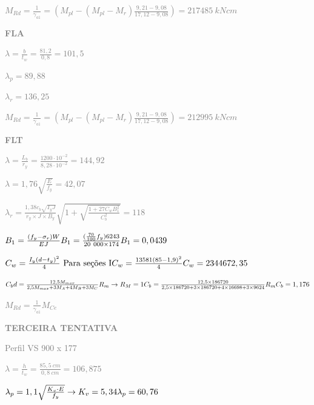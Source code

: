 \begin{enumerate}
    \textcolor{gray}{$M_{Rd} = \frac{1}{\gamma_{a1}} = (M_{pl}-(M_{pl}-M_r)\frac{9,21-9,08}{17,12-9,08})= 217485 \ kNcm$}

    \textcolor{gray}{\textbf{FLA}}

    \textcolor{gray}{$\lambda = \frac{b}{t_w} = \frac{81,2}{0,8} = 101,5$}

    \textcolor{gray}{$\lambda_p = 89,88$}

    \textcolor{gray}{$\lambda_r = 136,25$}

    \textcolor{gray}{$M_{Rd} = \frac{1}{\gamma_{a1}} = (M_{pl}-(M_{pl}-M_r)\frac{9,21-9,08}{17,12-9,08}) = 212995 \ kNcm$}

    \textcolor{gray}{\textbf{FLT}}

    \textcolor{gray}{$\lambda = \frac{L_b}{r_y} = \frac{1200 \cdot 10^{-2}}{8,28 \cdot 10^{-2}} = 144,92$}

    \textcolor{gray}{$\lambda = 1,76 \sqrt{\frac{E}{f_y}} = 42,07$}

    \textcolor{gray}{$\lambda_r = \frac{1,38 c_b \sqrt{I_yJ}}{r_y \times J \times B_y} \sqrt{1+ \sqrt{\frac{1+27C_w B_1^2}{C_b^2}}}= 118$}

    \textcolor{gray}{$B_1 = \frac{(f_y - \sigma_r)W}{EJ} \newline B_1 = \frac{(\frac{70}{100}f_y) 6243}{20 \ 000 \times 174} \newline B_1 = 0,0439$}

    \textcolor{gray}{$C_w = \frac{I_y(d-t_y)^2}{4} \ \text{Para seções I} \newline C_w = \frac{13581(85-1,9)^2}{4} \newline C_w = 2344672,35$}

    \textcolor{gray}{$C_b d = \frac{12,5 M_{max}}{2,5M_{max}+3M_A+4M_B+3M_C}R_m  \to R_M =1 \newline C_b = \frac{12,5 \times 186720}{2,5 \times 186720+3 \times 186720 +4 \times 16698 +3 \times 9624}R_m \newline C_b = 1,176$}

    \textcolor{gray}{$M_{Rd} = \frac{1}{\gamma_{a1}} M_{Ce}$}


    \newpage

    \textcolor{gray}{\textbf{\MakeUppercase{Terceira tentativa}}}

    \textcolor{gray}{Perfil VS 900 x 177}

    \textcolor{gray}{$\lambda = \frac{h}{t_w} = \frac{85,5 \ cm}{0,8 \ cm} = 106,875$}

    \textcolor{gray}{$\lambda_p = 1,1 \sqrt{\frac{K_v \cdot E}{f_y}} \to K_v = 5,34 \newline \lambda_p = 60,76$}


\end{enumerate}
